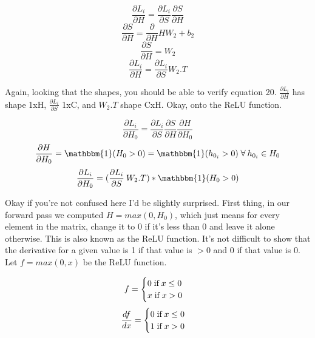 \documentclass[12pt]{article}
\begin{document}
\begin{equation}
    \frac{\partial L_i}{\partial H} = \frac{\partial L_i}{\partial S} \frac{\partial S}{\partial H}
\end{equation}
\begin{equation}
    \frac{\partial S}{\partial H} = \frac{\partial }{\partial H} HW_2 + b_2
\end{equation}
\begin{equation}
    \frac{\partial S}{\partial H} = W_2
\end{equation}
\begin{equation}
    \frac{\partial L_i}{\partial H} = \frac{\partial L_i}{\partial S} W_2.T
\end{equation}

Again, looking that the shapes, you should be able to verify equation 20. $\frac{\partial L_i}{\partial H}$
has shape 1xH, $\frac{\partial L_i}{\partial S}$ 1xC, and $W_2.T$ shape CxH. Okay, onto the ReLU function. 

\begin{equation}
    \frac{\partial L_i}{\partial H_0} = \frac{\partial L_i}{\partial S} \frac{\partial S}{\partial H}
    \frac{\partial H}{\partial H_0}
\end{equation}
\begin{equation}
    \frac{\partial H}{\partial H_0} = \mathbbm{1}(H_0 > 0) = \mathbbm{1}(h_{0_i} > 0) \; \forall \: h_{0_i} \in H_0
\end{equation}
\begin{equation}
    \frac{\partial L_i}{\partial H_0} = (\frac{\partial L_i}{\partial S}\: W_2.T) * \mathbbm{1}(H_0 > 0)
\end{equation}

Okay if you're not confused here I'd be slightly surprised. First thing, in our forward pass we computed 
$H = max(0, H_0)$, which just means for every element in the matrix, change it to 0 if it's less than 0 
and leave it alone otherwise. This is also known as the ReLU function. It's not difficult to show that 
the derivative for a given value is 1 if that value is $> 0$ and 0 if that value is 0. Let $f = max(0, x)$
be the ReLU function. 

\begin{equation}
    f = 
    \begin{cases}
        0 \; $if$ \; x \le 0\\
        x \; $if$ \; x > 0
    \end{cases} 
\end{equation}
\begin{equation}
    \frac{df}{dx} = 
    \begin{cases}
        0 \; $if$ \; x \le 0\\
        1 \; $if$ \; x > 0
    \end{cases} 
\end{equation}
\end{document}
